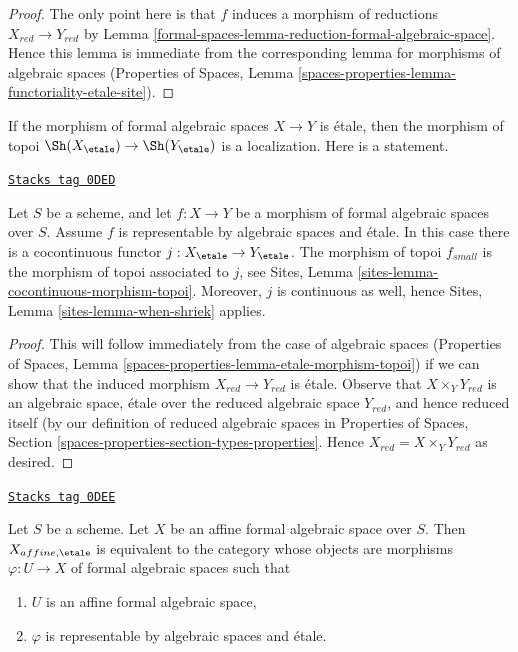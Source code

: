 \begin{proof}
The only point here is that $f$ induces a morphism of reductions
$X_{red} \to Y_{red}$ by Lemma \ref{formal-spaces-lemma-reduction-formal-algebraic-space}.
Hence this lemma is immediate from the corresponding lemma for
morphisms of algebraic spaces (Properties of Spaces,
Lemma \ref{spaces-properties-lemma-functoriality-etale-site}).
\end{proof}

If the morphism of formal algebraic spaces $X \to Y$ is \'etale,
then the morphism of topoi $\Sh(X_\etale) \to \Sh(Y_\etale)$
is a localization. Here is a statement.

\begin{lemma}
\label{formal-spaces-lemma-etale-morphism-topoi}
\href{https://stacks.math.columbia.edu/tag/0DED}{\texttt{Stacks tag 0DED}}

Let $S$ be a scheme, and let $f : X \to Y$ be a morphism of
formal algebraic spaces over $S$. Assume $f$ is representable
by algebraic spaces and \'etale. In this case there is a
cocontinuous functor $j : X_\etale \to Y_\etale$.
The morphism of topoi $f_{small}$ is the
morphism of topoi associated to $j$, see
Sites, Lemma \ref{sites-lemma-cocontinuous-morphism-topoi}.
Moreover, $j$ is continuous as well, hence
Sites, Lemma \ref{sites-lemma-when-shriek} applies.
\end{lemma}

\begin{proof}
This will follow immediately from the case of algebraic spaces
(Properties of Spaces, Lemma
\ref{spaces-properties-lemma-etale-morphism-topoi})
if we can show that the induced morphism $X_{red} \to Y_{red}$
is \'etale. Observe that $X \times_Y Y_{red}$ is an
algebraic space, \'etale over the reduced algebraic space $Y_{red}$,
and hence reduced itself (by our definition of reduced algebraic
spaces in Properties of Spaces, Section
\ref{spaces-properties-section-types-properties}.
Hence $X_{red} = X \times_Y Y_{red}$ as desired.
\end{proof}

\begin{lemma}
\label{formal-spaces-lemma-affine-identify-affine-etale}
\href{https://stacks.math.columbia.edu/tag/0DEE}{\texttt{Stacks tag 0DEE}}

Let $S$ be a scheme. Let $X$ be an affine formal algebraic space over $S$.
Then $X_{affine, \etale}$ is equivalent to the category whose objects
are morphisms $\varphi : U \to X$ of formal algebraic spaces such that
\begin{enumerate}
\item $U$ is an affine formal algebraic space,
\item $\varphi$ is representable by algebraic spaces and \'etale.
\end{enumerate}
\end{lemma}

